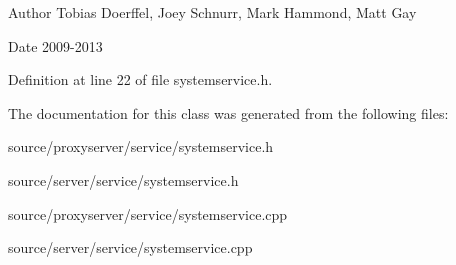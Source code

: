 \begin{DoxyAuthor}{Author}
Tobias Doerffel, Joey Schnurr, Mark Hammond, Matt Gay 
\end{DoxyAuthor}
\begin{DoxyDate}{Date}
2009-\/2013 
\end{DoxyDate}


Definition at line 22 of file systemservice.\-h.



The documentation for this class was generated from the following files\-:\begin{DoxyCompactItemize}
\item 
source/proxyserver/service/systemservice.\-h\item 
source/server/service/systemservice.\-h\item 
source/proxyserver/service/systemservice.\-cpp\item 
source/server/service/systemservice.\-cpp\end{DoxyCompactItemize}
